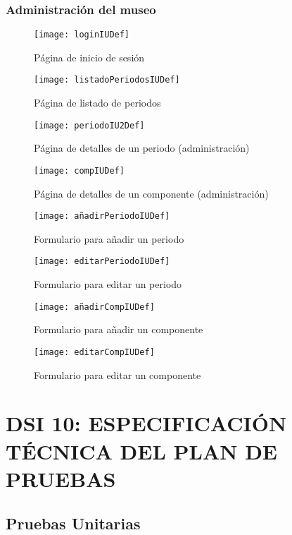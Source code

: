 \subsubsection{Administración del museo}
\begin{figure}[H]
\centering
\texttt{[image: loginIUDef]}
\caption{Página de inicio de sesión}
\end{figure}
\begin{figure}[H]
\centering
\texttt{[image: listadoPeriodosIUDef]}
\caption{Página de listado de periodos}
\end{figure}
\begin{figure}[H]
\centering
\texttt{[image: periodoIU2Def]}
\caption{Página de detalles de un periodo (administración)}
\end{figure}
\begin{figure}[H]
\centering
\texttt{[image: compIUDef]}
\caption{Página de detalles de un componente (administración)}
\end{figure}
\begin{figure}[H]
\centering
\texttt{[image: añadirPeriodoIUDef]}
\caption{Formulario para añadir un periodo}
\end{figure}
\begin{figure}[H]
\centering
\texttt{[image: editarPeriodoIUDef]}
\caption{Formulario para editar un periodo}
\end{figure}
\begin{figure}[H]
\centering
\texttt{[image: añadirCompIUDef]}
\caption{Formulario para añadir un componente}
\end{figure}
\begin{figure}[H]
\centering
\texttt{[image: editarCompIUDef]}
\caption{Formulario para editar un componente}
\end{figure}




\newpage
\section{DSI 10: ESPECIFICACIÓN TÉCNICA DEL PLAN DE PRUEBAS}

\subsection{Pruebas Unitarias} 

